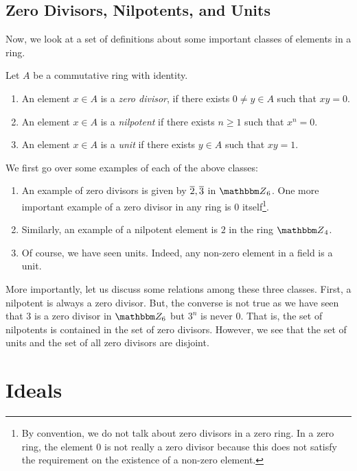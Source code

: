 \subsection{Zero Divisors, Nilpotents, and Units}
Now, we look at a set of definitions about some important classes of elements in a ring.
\begin{definition}\label{def: zero-nil-unit}
Let $A$ be a commutative ring with identity.
    \begin{enumerate}
        \item An element $x \in A$ is a {\it zero divisor}, if there exists $0 \neq y \in A$ such that $x y=0$.
        \item An element $x \in A$ is a {\it nilpotent} if there exists $n \geq 1$ such that $x^{n}=0$.
        \item An element $x \in A$ is a {\it unit} if there exists $y \in A$ such that $x y=1$.
    \end{enumerate}
\end{definition} 
\begin{example}
    We first go over some examples of each of the above classes: 
    \begin{enumerate}
    \item An example of zero divisors is given by \(\overline{2}, \overline{3}\) in \({\Z}_{6}\). One more important example of a zero divisor in any ring is 0 itself\footnote{By convention, we do not talk about zero divisors in a zero ring. In a zero ring, the element 0 is not really a zero divisor because this does not satisfy the requirement on the existence of a non-zero element.}. 
    \item Similarly,  an example of a nilpotent element is $2$ in the ring ${\Z}_{4}$.
    \item Of course, we have seen units. Indeed, any non-zero element in a field is a unit.
    \end{enumerate}
\end{example}

More importantly, let us discuss some relations among these three classes. First, a nilpotent is always a zero divisor. But, the converse is not true as we have seen that $3$ is a zero divisor in $\Z_6$ 
 but $3^{n}$ is never 0. That is, the set of nilpotents is contained in the set of zero divisors. However, we see that the set of units and the set of all zero divisors are disjoint.
 
\section{Ideals}

